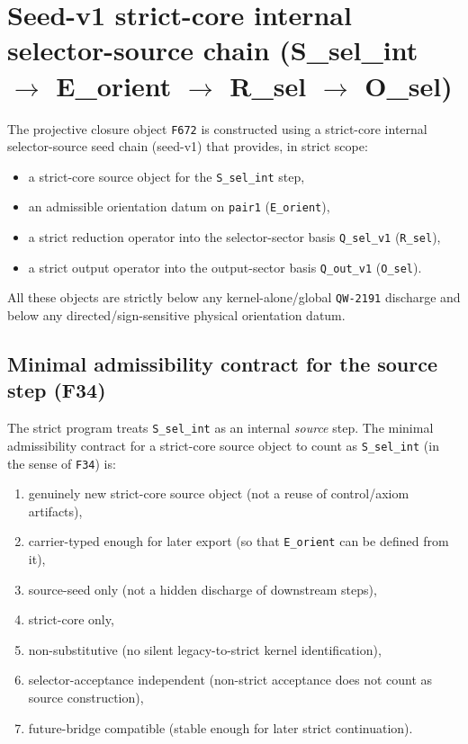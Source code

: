 \documentclass[11pt,a4paper]{article}
\begin{document}
\section{Seed-v1 strict-core internal selector-source chain (S\_sel\_int $\to$ E\_orient $\to$ R\_sel $\to$ O\_sel)}

The projective closure object \texttt{F672} is constructed using a strict-core internal selector-source seed chain (seed-v1) that provides, in strict scope:

\begin{itemize}
  \item a strict-core source object for the \texttt{S\_sel\_int} step,
  \item an admissible orientation datum on \texttt{pair1} (\texttt{E\_orient}),
  \item a strict reduction operator into the selector-sector basis \texttt{Q\_sel\_v1} (\texttt{R\_sel}),
  \item a strict output operator into the output-sector basis \texttt{Q\_out\_v1} (\texttt{O\_sel}).
\end{itemize}

All these objects are strictly below any kernel-alone/global \texttt{QW-2191} discharge and below any directed/sign-sensitive physical orientation datum.

\subsection{Minimal admissibility contract for the source step (F34)}

The strict program treats \texttt{S\_sel\_int} as an internal \emph{source} step.
The minimal admissibility contract for a strict-core source object to count as \texttt{S\_sel\_int} (in the sense of \texttt{F34}) is:
\begin{enumerate}[label=\arabic*.]
  \item genuinely new strict-core source object (not a reuse of control/axiom artifacts),
  \item carrier-typed enough for later export (so that \texttt{E\_orient} can be defined from it),
  \item source-seed only (not a hidden discharge of downstream steps),
  \item strict-core only,
  \item non-substitutive (no silent legacy-to-strict kernel identification),
  \item selector-acceptance independent (non-strict acceptance does not count as source construction),
  \item future-bridge compatible (stable enough for later strict continuation).
\end{enumerate}
\end{document}
